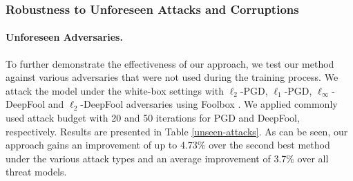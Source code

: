 

\subsubsection{Robustness to Unforeseen Attacks and Corruptions}
\paragraph{Unforeseen Adversaries.} To further demonstrate the effectiveness of our approach, we test our method against various adversaries that were not used during the training process. We attack the model under the white-box settings with $\ell_{2}$-PGD, $\ell_{1}$-PGD, $\ell_{\infty}$-DeepFool and $\ell_{2}$-DeepFool \citep{moosavi2016deepfool} adversaries using Foolbox \citep{rauber2017foolbox}. We applied commonly used attack budget 
with 20 and 50 iterations for PGD and DeepFool, respectively.
Results are presented in Table \ref{unseen-attacks}. As can be seen, our approach  gains an improvement of up to 4.73\% over the second best method under the various attack types and an average improvement of 3.7\% over all threat models.


